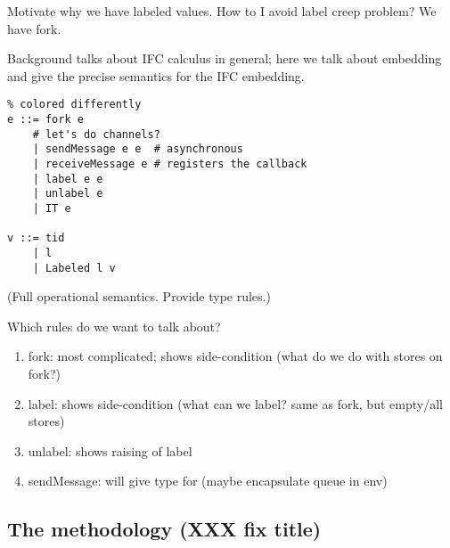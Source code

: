 {Motivate why we have labeled values. How to I avoid label creep problem? We
have fork. 

Background talks about IFC calculus in general; here we talk about
embedding and give the precise semantics for the IFC embedding.



\begin{verbatim}
% colored differently
e ::= fork e
    # let's do channels?
    | sendMessage e e  # asynchronous
    | receiveMessage e # registers the callback
    | label e e
    | unlabel e
    | IT e

v ::= tid
    | l
    | Labeled l v
\end{verbatim}


%

(Full operational semantics. Provide type rules.)


Which rules do we want to talk about?

\begin{enumerate}
\item fork: most complicated; shows side-condition (what do we do with stores on fork?)
\item label:  shows side-condition (what can we label? same as fork, but empty/all stores)
\item unlabel: shows raising of label
\item sendMessage: will give type for (maybe encapsulate queue in env)
\end{enumerate}

\subsection{The methodology (XXX fix title)}
\label{sec:methodology}

}
